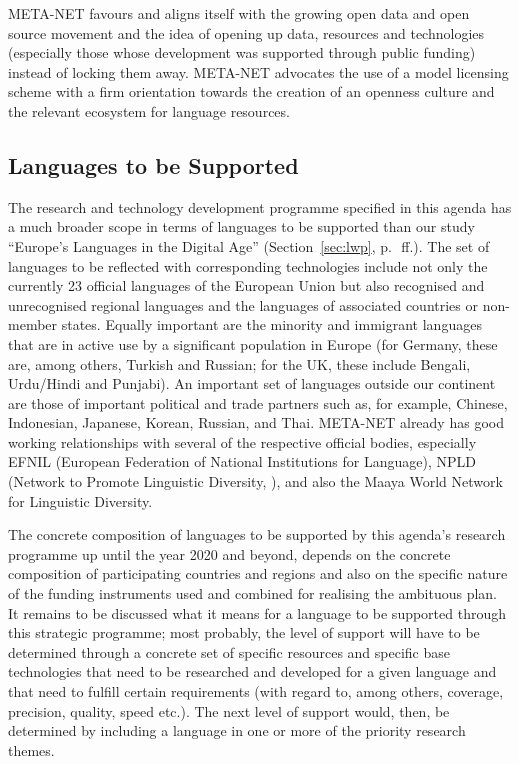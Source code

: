 \documentclass[10pt, plain]{../../metanetpaper}
\begin{document}
\begin{multicols}{2}
META-NET favours and aligns itself with the growing open data and open source movement and the idea of opening up data, resources and technologies (especially those whose development was supported through public funding) instead of locking them away. META-NET advocates the use of a model licensing scheme with a firm orientation towards the creation of an openness culture and the relevant ecosystem for language resources.

\subsection{Languages to be Supported}
\label{sec:languages-to-be-supported}

The research and technology development programme specified in this agenda has a much broader scope in terms of languages to be supported than our study ``Europe's Languages in the Digital Age'' (Section~\ref{sec:lwp}, p.~\pageref{sec:lwp}\,ff.). The set of languages to be reflected with corresponding technologies include not only the currently 23 official languages of the European Union but also recognised and unrecognised regional languages and the languages of associated countries or non-member states. Equally important are the minority and immigrant languages that are in active use by a significant population in Europe (for Germany, these are, among others, Turkish and Russian; for the UK, these include Bengali, Urdu/Hindi and Punjabi). An important set of languages outside our continent are those of important political and trade partners such as, for example, Chinese, Indonesian, Japanese, Korean, Russian, and Thai. META-NET already has good working relationships with several of the respective official bodies, especially EFNIL (European Federation of National Institutions for Language), NPLD (Network to Promote Linguistic Diversity, \cite{eldia12}), and also the Maaya World Network for Linguistic Diversity.

The concrete composition of languages to be supported by this agenda's research programme up until the year 2020 and beyond, depends on the concrete composition of participating countries and regions and also on the specific nature of the funding instruments used and combined for realising the ambituous plan. It remains to be discussed what it means for a language to be supported through this strategic programme; most probably, the level of support will have to be determined through a concrete set of specific resources and specific base technologies that need to be researched and developed for a given language and that need to fulfill certain requirements (with regard to, among others, coverage, precision, quality, speed etc.). The next level of support would, then, be determined by including a language in one or more of the priority research themes.


\end{multicols}
\end{document}
